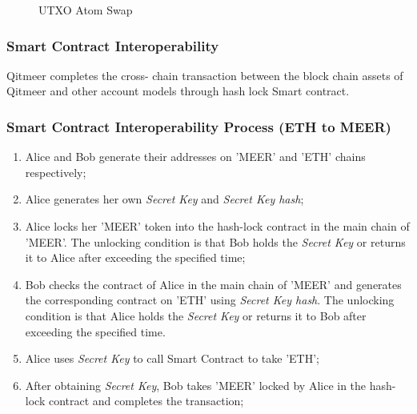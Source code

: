 \documentclass[a4paper,11pt]{article}
\begin{document}
\begin{figure}[hbt]
	\centerline{%
	}
\caption{UTXO Atom Swap}
\end{figure}



\subsubsection{Smart Contract Interoperability}

Qitmeer completes the cross- chain transaction between the block chain assets of Qitmeer and  other account models through hash lock Smart contract.

\subsubsection*{Smart Contract Interoperability Process (ETH to MEER)}

\begin{enumerate}
\item  Alice and Bob generate their addresses on 'MEER' and 'ETH' chains respectively;

\item   Alice generates her own \textit{Secret Key} and \textit{Secret Key hash};

 \item  Alice locks her 'MEER' token into the hash-lock contract in the main chain of 'MEER'. The unlocking condition is that Bob holds the \textit{Secret Key} or returns it to Alice after exceeding the specified time;

 \item  Bob checks the contract of Alice in the main chain of 'MEER' and generates the corresponding contract on 'ETH' using \textit{Secret Key hash}. The unlocking condition is that Alice holds the \textit{Secret Key } or returns it to Bob after exceeding the specified time.

 \item  Alice uses \textit{Secret Key} to call Smart Contract to take 'ETH';

 \item  After obtaining \textit{Secret Key}, Bob takes 'MEER' locked by Alice in the hash-lock contract and completes the transaction;

\end{enumerate}
\end{document}
